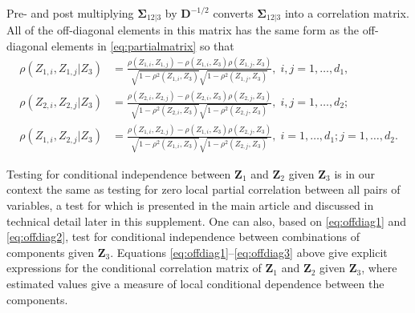 \documentclass[
  12pt,
  letterpaper]{article}
\numberwithin{equation}{section}
\newcommand{\Z}{\bm{Z}}
\newcommand{\D}{\bm{D}}
\newcommand{\fSigma}{\bm{\Sigma}}
\begin{document}
\begin{itemize}
Pre- and post multiplying $\fSigma_{12|3}$ by $\D^{-1/2}$ converts $\fSigma_{12|3}$ into a correlation matrix. All of the off-diagonal elements in this matrix has the same form as the off-diagonal elements in \eqref{eq:partialmatrix} so that
\begin{align}
\rho(Z_{1,i},Z_{1,j}|Z_3) &= \frac{\rho(Z_{1,i},Z_{1,j}) - \rho(Z_{1,i},Z_3)\rho(Z_{1,j},Z_3)}{\sqrt{1-\rho^2(Z_{1,i},Z_3)} \sqrt{1-\rho^2(Z_{1,j},Z_3)}} 
, \; i,j = 1,\ldots,d_1, \label{eq:offdiag1}\\
\rho(Z_{2,i},Z_{2,j}|Z_3) &= \frac{\rho(Z_{2,i},Z_{2,j}) - \rho(Z_{2,i},Z_3)\rho(Z_{2,j},Z_3)}{\sqrt{1-\rho^2(Z_{2,i},Z_3)} \sqrt{1-\rho^2(Z_{2,j},Z_3)}}
, \; i,j = 1,\ldots,d_2; \label{eq:offdiag2} \\
\rho(Z_{1,i},Z_{2,j}|Z_3) &= \frac{\rho(Z_{1,i},Z_{2,j}) - \rho(Z_{1,i},Z_3)\rho(Z_{2,j},Z_3)}{\sqrt{1-\rho^2(Z_{1,i},Z_3)} \sqrt{1-\rho^2(Z_{2,j},Z_3)}}
, \; i = 1,\ldots,d_1; j=1,\ldots,d_2. \label{eq:offdiag3}
\end{align}

Testing for conditional independence between $\Z_1$ and $\Z_2$ given $\Z_3$ is in our context the same as testing for zero local partial correlation between all pairs of variables, a test for which is presented in the main article and discussed in technical detail later in this supplement. One can also, based on \eqref{eq:offdiag1} and \eqref{eq:offdiag2}, test for conditional independence between combinations of components given $\Z_3$. Equations \eqref{eq:offdiag1}--\eqref{eq:offdiag3} above give explicit expressions for the conditional correlation matrix of $\Z_1$ and $\Z_2$ given $\Z_3$, where estimated values give a measure of local conditional dependence between the components.  


\end{itemize}
\end{document}
